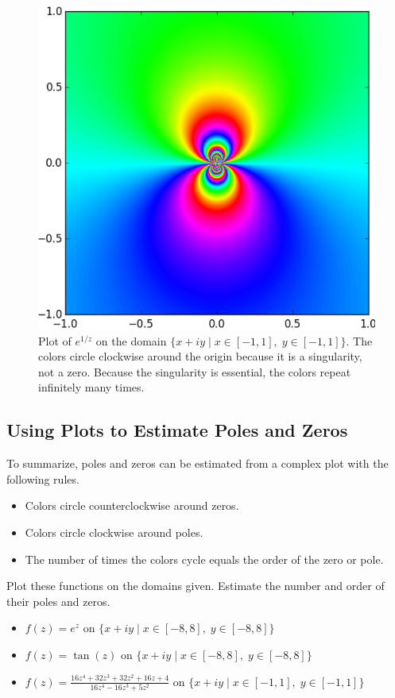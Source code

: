 \begin{figure}
\includegraphics[width=.6\textwidth]{figures/essential_pole.pdf}
\caption{Plot of $e^{1/z}$ on the domain $\{x+iy \mid x \in [-1,1] , \; y \in [-1,1]\}$.
The colors circle clockwise around the origin because it is a singularity, not a zero.
Because the singularity is essential, the colors repeat infinitely many times.}
\label{fig:essential_singularity}
\end{figure}

\subsection*{Using Plots to Estimate Poles and Zeros}
To summarize, poles and zeros can be estimated from a complex plot with the following rules.
\begin{itemize}
\item Colors circle counterclockwise around zeros.
\item Colors circle clockwise around poles.
\item The number of times the colors cycle equals the order of the zero or pole.
\end{itemize}

\begin{problem}\label{prob:findpz}
Plot these functions on the domains given.
Estimate the number and order of their poles and zeros.
\begin{itemize}
\item $f(z) = e^z$ on $\{ x+iy \mid x \in [-8,8], \; y \in [-8,8]\}$
\item $f(z) = \tan(z)$ on $\{x+iy \mid x \in [-8,8], \; y \in [-8,8]\}$
\item $f(z) = \frac{16z^4+32z^3+32z^2+16z+4}{16z^4-16z^3+5z^2}$ on $\{x+iy \mid x \in [-1,1], \; y \in [-1,1]\}$
\end{itemize}
\end{problem}

